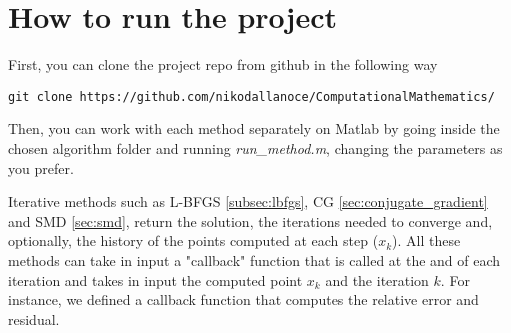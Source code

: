 \section{How to run the project}\label{sec:how_to_run_project}
First, you can clone the project repo from github in the following way
\begin{verbatim}
git clone https://github.com/nikodallanoce/ComputationalMathematics/
\end{verbatim}
Then, you can work with each method separately on Matlab by going inside the chosen algorithm folder and running \textit{run\_method.m}, changing the parameters as you prefer.
\vspace{3mm}

\noindent Iterative methods such as L-BFGS \ref{subsec:lbfgs}, CG \ref{sec:conjugate_gradient} and SMD \ref{sec:smd}, return the solution, the iterations needed to converge and, optionally, the history of the points computed at each step ($x_k$). All these methods can take in input a "callback" function that is called at the and of each iteration and takes in input the computed point $x_k$ and the iteration $k$. For instance, we defined a callback function that computes the relative error and residual.
